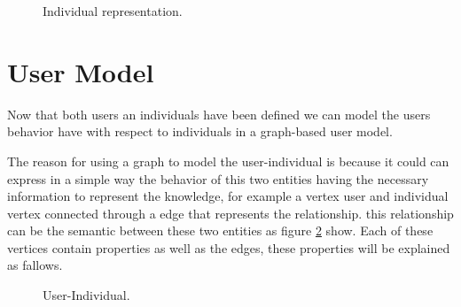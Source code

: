 \begin{figure}
\captionsetup{justification=centering,margin=2cm}
\centering
\setlength\fboxsep{0pt}
\setlength\fboxrule{0.7pt}
\caption{Individual representation.}
\label{fig:graph}
\end{figure}


\section{User Model} Now that both users an individuals have been defined we can
model the users behavior have with respect to individuals in a graph-based user
model.

The reason for using a graph to model the user-individual is because it could
can express in a simple way the behavior of this two entities having the
necessary information  to represent the knowledge,  for example a vertex user
and individual vertex connected through a edge that  represents the
relationship. this relationship can be the semantic  between these two entities
as figure \ref{fig:User-Individual} show. Each of these vertices contain properties as well as the
edges, these properties will be explained as fallows.

\begin{figure}
\captionsetup{justification=centering,margin=2cm}
\centering
\setlength\fboxsep{0pt}
\setlength\fboxrule{0.7pt}
\caption{User-Individual.}
\label{fig:User-Individual}
\end{figure}

